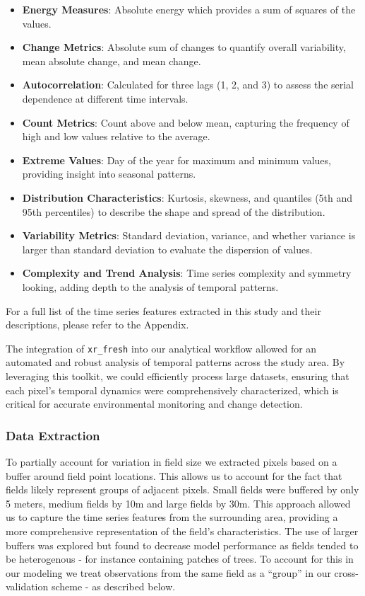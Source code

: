\documentclass[
  journal,
  twocolumn]{IEEEtran}
\providecommand{\tightlist}{%
  \setlength{\itemsep}{0pt}\setlength{\parskip}{0pt}}
\begin{document}
\begin{itemize}
\tightlist
\item
  \textbf{Energy Measures}: Absolute energy which provides a sum of
  squares of the values.
\item
  \textbf{Change Metrics}: Absolute sum of changes to quantify overall
  variability, mean absolute change, and mean change.
\item
  \textbf{Autocorrelation}: Calculated for three lags (1, 2, and 3) to
  assess the serial dependence at different time intervals.
\item
  \textbf{Count Metrics}: Count above and below mean, capturing the
  frequency of high and low values relative to the average.
\item
  \textbf{Extreme Values}: Day of the year for maximum and minimum
  values, providing insight into seasonal patterns.
\item
  \textbf{Distribution Characteristics}: Kurtosis, skewness, and
  quantiles (5th and 95th percentiles) to describe the shape and spread
  of the distribution.
\item
  \textbf{Variability Metrics}: Standard deviation, variance, and
  whether variance is larger than standard deviation to evaluate the
  dispersion of values.
\item
  \textbf{Complexity and Trend Analysis}: Time series complexity and
  symmetry looking, adding depth to the analysis of temporal patterns.
\end{itemize}

For a full list of the time series features extracted in this study and
their descriptions, please refer to the Appendix.

The integration of \texttt{xr\_fresh} into our analytical workflow
allowed for an automated and robust analysis of temporal patterns across
the study area. By leveraging this toolkit, we could efficiently process
large datasets, ensuring that each pixel's temporal dynamics were
comprehensively characterized, which is critical for accurate
environmental monitoring and change detection.

\hypertarget{data-extraction}{%
\subsubsection{Data Extraction}\label{data-extraction}}

To partially account for variation in field size we extracted pixels
based on a buffer around field point locations. This allows us to
account for the fact that fields likely represent groups of adjacent
pixels. Small fields were buffered by only 5 meters, medium fields by
10m and large fields by 30m. This approach allowed us to capture the
time series features from the surrounding area, providing a more
comprehensive representation of the field's characteristics. The use of
larger buffers was explored but found to decrease model performance as
fields tended to be heterogenous - for instance containing patches of
trees. To account for this in our modeling we treat observations from
the same field as a ``group'' in our cross-validation scheme - as
described below.
\end{document}
